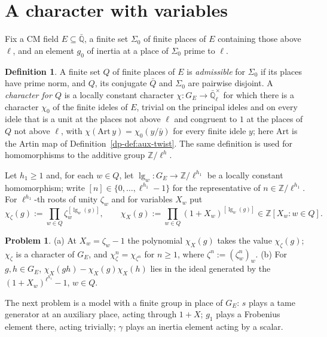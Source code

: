 \documentclass[reqno]{amsart}
\theoremstyle{definition}
\newtheorem{problem}{Problem}[section]
\newtheorem{definition}{Definition}[section]
\theoremstyle{plain}
\newcommand{\Z}{\mathbb{Z}}
\newcommand{\Q}{\mathbb{Q}}
\newcommand{\Ql}{\bar{\mathbb{Q}}_\ell}
\begin{document}
\section{A character with variables}\label{sec:universal}

Fix a CM field \(E \subseteq \bar{\Q}\), a finite set \(\Sigma_0\) of finite places of \(E\) containing those above \(\ell\), and an element \(g_0\) of inertia at a place of \(\Sigma_0\) prime to \(\ell\).

\begin{definition}\label{def:chi}
A finite set \(Q\) of finite places of \(E\) is \emph{admissible} for \(\Sigma_0\) if its places have prime norm, and \(Q\), its conjugate \(\bar Q\) and \(\Sigma_0\) are pairwise disjoint.  A \emph{character for \(Q\)} is a locally constant character \(\chi\colon G_E\to\Ql^\times\) for which there is a character \(\chi_0\) of the finite ideles of \(E\), trivial on the principal ideles and on every idele that is a unit at the places not above \(\ell\) and congruent to \(1\) at the places of \(Q\) not above \(\ell\), with \(\chi(\mathrm{Art}\,y)=\chi_0(y/\bar y)\) for every finite idele \(y\); here \(\mathrm{Art}\) is the Artin map of Definition~\ref{dp-def:aux-twist}.  The same definition is used for homomorphisms to the additive group \(\Z/\ell^{h}\).

Let \(h_1 \ge 1\) and, for each \(w \in Q\), let \(\lg_w \colon G_E \to \Z/\ell^{h_1}\) be a locally constant homomorphism; write \([n] \in \{0, \dots, \ell^{h_1} - 1\}\) for the representative of \(n \in \Z/\ell^{h_1}\).  For \(\ell^{h_1}\)-th roots of unity \(\zeta_w\) and for variables \(X_w\) put
\[
  \chi_\zeta(g) := \prod_{w \in Q} \zeta_w^{[\lg_w(g)]}, \qquad \chi_X(g) := \prod_{w \in Q} (1 + X_w)^{[\lg_w(g)]} \in \Z[X_w : w \in Q] .
\]
\end{definition}

\begin{problem}\label{pr:universal}
\textup{(a)} At \(X_w = \zeta_w - 1\) the polynomial \(\chi_X(g)\) takes the value \(\chi_\zeta(g)\); \(\chi_\zeta\) is a character of \(G_E\), and \(\chi_\zeta^n = \chi_{\zeta^n}\) for \(n \ge 1\), where \(\zeta^n := (\zeta_w^n)_w\).
\textup{(b)} For \(g, h \in G_E\), \(\chi_X(gh) - \chi_X(g)\chi_X(h)\) lies in the ideal generated by the \((1 + X_w)^{\ell^{h_1}} - 1\), \(w \in Q\).
\end{problem}

The next problem is a model with a finite group in place of \(G_E\): \(s\) plays a tame generator at an auxiliary place, acting through \(1 + X\); \(g_1\) plays a Frobenius element there, acting trivially; \(\gamma\) plays an inertia element acting by a scalar.
\end{document}

